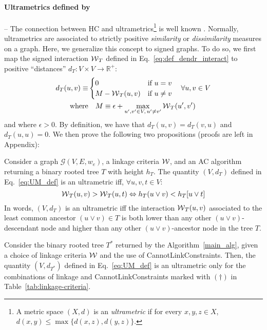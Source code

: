 \begin{algorithm}[t]
\end{algorithm}


\paragraph{Ultrametrics defined by \algname{}} -- The connection between HC and ultrametrics\footnote{A metric space $(X,d)$ is an \emph{ultrametric} if for every $x,y,z \in X$, $d(x,y)\leq \max \{d(x,z), d(y,z)\}$.} is well known \cite{johnson1967hierarchical,milligan1979ultrametric}. Normally, ultrametrics are associated to strictly positive \emph{similarity} or \emph{dissimilarity} measures on a graph. Here, we generalize this concept to signed graphs. To do so, we first map the signed interaction $\mathcal{W}{}_{T}{}$ defined in Eq.~\ref{eq:def_dendr_interact} to positive ``distances'' $d_{T}:V \times V \rightarrow \mathbb{R}^{+}$:
\begin{align}\label{eq:UM_def}
d_{T}(u,v)\equiv &\begin{cases}
0 & \text{if}\,\, u=v\\
M-\mathcal{W}{}_{T}(u,v) & \text{if}\,\, u\neq v
\end{cases}\quad \forall u,v\in V\\
\mathrm{where}& \quad  M \equiv  \epsilon + \max_{u',v'\in V,\,u'\neq v'}\mathcal{W}{}_{T}(u',v')
\end{align}
and where $\epsilon > 0$. By definition, we have that $d_{T}(u,v)=d_{T}(v,u)$ and $d_{T}(u,u)= 0$. We then prove the following two propositions (proofs are left in Appendix):
\begin{prop}
Consider a graph $\mathcal{G}(V,E,w_e)$, a linkage criteria $\mathcal{W}{}$, and an AC algorithm returning a binary rooted tree $T$ with height $h_T$. The quantity $(V, d_{T})$ defined in Eq.~\ref{eq:UM_def} is an ultrametric iff, $\forall u,v,t \in V$:
\begin{equation}
\mathcal{W}{}_{T}(u,v) > \mathcal{W}{}_{T}(u,t) \Leftrightarrow h_T(u \vee v) < h_T[u \vee t] 
\end{equation}
In words, $(V, d_{T})$ is an ultrametric iff the interaction $\mathcal{W}{}_{T}(u, v)$ associated to the least common ancestor ${(u\vee v)\in T}$ is both lower than any other $(u\vee v)$-descendant node and higher than any other $(u\vee v)$-ancestor node in the tree $T$.
\end{prop}
\begin{prop}
Consider the binary rooted tree $T^*$ returned by the \algname{} Algorithm~\ref{main_alg}, given a choice of linkage criteria $\mathcal{W}{}$ and the use of CannotLinkConstraints. Then, the quantity $(V, d_{T^*})$ defined in Eq.~\ref{eq:UM_def} is an ultrametric only for the combinations of linkage and CannotLinkConstraints marked with $(\dagger)$ in Table~\ref{tab:linkage-criteria}.
\end{prop}




